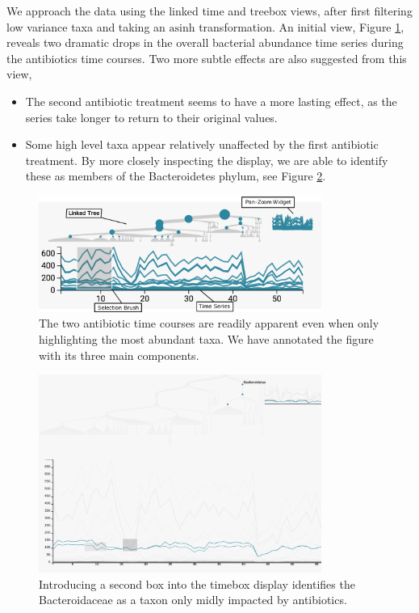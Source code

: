 \documentclass[12pt]{article}
\begin{document}
We approach the data using the linked time and treebox views, after
first filtering low variance taxa and taking an \(\text{asinh}\)
transformation. An initial view, Figure \ref{fig:antibioticoverview},
reveals two dramatic drops in the overall bacterial abundance time
series during the antibiotics time courses. Two more subtle effects are
also suggested from this view,

\begin{itemize}
\item
  The second antibiotic treatment seems to have a more lasting effect,
  as the series take longer to return to their original values.
\item
  Some high level taxa appear relatively unaffected by the first
  antibiotic treatment. By more closely inspecting the display, we are
  able to identify these as members of the Bacteroidetes phylum, see
  Figure \ref{fig:antibioticbacteroidetes}.
\end{itemize}

\begin{figure}

{\centering \includegraphics[width=350px]{figure/annotated_antibiotic_overview}

}

\caption{The two antibiotic time courses are readily apparent even when only highlighting the most abundant taxa. We have annotated the figure with its three main components.}\label{fig:antibioticoverview}
\end{figure}

\begin{figure}

{\centering \includegraphics[width=350px]{figure/antibiotic_bacteroidetes}

}

\caption{Introducing a second box into the timebox display identifies the Bacteroidaceae as a taxon only midly impacted by antibiotics.}\label{fig:antibioticbacteroidetes}
\end{figure}
\end{document}
